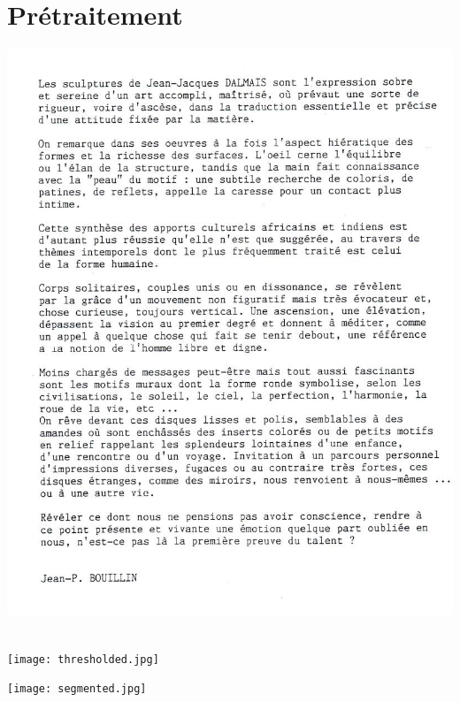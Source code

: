 \documentclass[a4paper,12pt]{report}
\begin{document}


\section{Pr\'etraitement} %
\label{sec:pr'etraitement}

\begin{center}
\includegraphics[width=160mm]{texte2.jpg}\\
\caption{\emph{Le texte que l'on va traiter}}\\

\texttt{[image: thresholded.jpg]}\\
\caption{\emph{L'image obtenu apr\`es pr\'etraitement}}

\texttt{[image: segmented.jpg]}\\
\caption{\emph{Le texte d\'ecoup\'e en blocs}}
\end{center}

\pagebreak
\end{document}
